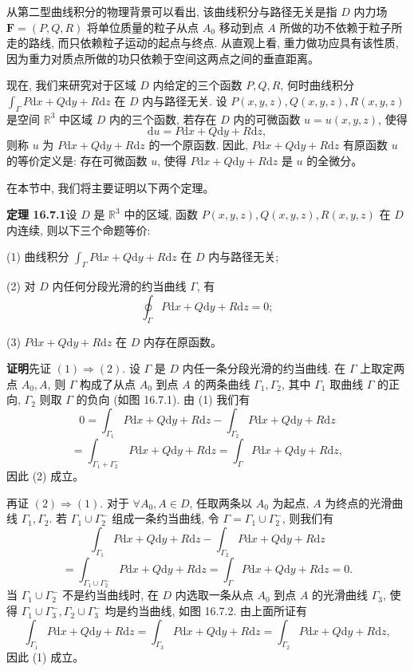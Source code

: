 \documentclass[UTF8,12pt,a4paper,fontset=fandol]{ctexart}
\begin{document}
从第二型曲线积分的物理背景可以看出, 该曲线积分与路径无关是指 $D$ 内力场 $\boldsymbol F=(P,Q,R)$ 将单位质量的粒子从点 $A_0$ 移动到点 $A$ 所做的功不依赖于粒子所走的路线, 而只依赖粒子运动的起点与终点. 从直观上看, 重力做功应具有该性质, 因为重力对质点所做的功只依赖于空间这两点之间的垂直距离。

现在, 我们来研究对于区域 $D$ 内给定的三个函数 $P,Q,R$, 何时曲线积分 $\int_\Gamma P\mathrm dx+Q\mathrm dy+R\mathrm dz$ 在 $D$ 内与路径无关. 设 $P(x,y,z),Q(x,y,z),R(x,y,z)$ 是空间 $\mathbb R^3$ 中区域 $D$ 内的三个函数, 若存在 $D$ 内的可微函数 $u=u(x,y,z)$, 使得
\[
  \mathrm du=P\mathrm dx+Q\mathrm dy+R\mathrm dz,
\]
则称 $u$ 为 $P\mathrm dx+Q\mathrm dy+R\mathrm dz$ 的一个原函数. 因此, $P\mathrm dx+Q\mathrm dy+R\mathrm dz$ 有原函数 $u$ 的等价定义是: 存在可微函数 $u$, 使得 $P\mathrm dx+Q\mathrm dy+R\mathrm dz$ 是 $u$ 的全微分。

在本节中, 我们将主要证明以下两个定理。

\noindent\textbf{定理 16.7.1}\quad 设 $D$ 是 $\mathbb R^3$ 中的区域, 函数 $P(x,y,z),Q(x,y,z),R(x,y,z)$ 在 $D$ 内连续, 则以下三个命题等价:

(1) 曲线积分 $\int_\Gamma P\mathrm dx+Q\mathrm dy+R\mathrm dz$ 在 $D$ 内与路径无关;

(2) 对 $D$ 内任何分段光滑的约当曲线 $\Gamma$, 有
\[
  \oint_\Gamma P\mathrm dx+Q\mathrm dy+R\mathrm dz=0;
\]

(3) $P\mathrm dx+Q\mathrm dy+R\mathrm dz$ 在 $D$ 内存在原函数。

\noindent\textbf{证明}\quad 先证 $(1)\Rightarrow(2)$. 设 $\Gamma$ 是 $D$ 内任一条分段光滑的约当曲线. 在 $\Gamma$ 上取定两点 $A_0,A$, 则 $\Gamma$ 构成了从点 $A_0$ 到点 $A$ 的两条曲线 $\Gamma_1,\Gamma_2$, 其中 $\Gamma_1$ 取曲线 $\Gamma$ 的正向, $\Gamma_2$ 则取 $\Gamma$ 的负向 (如图 16.7.1). 由 (1) 我们有
\[
  0=\int_{\Gamma_1}P\mathrm dx+Q\mathrm dy+R\mathrm dz
  -\int_{\Gamma_2}P\mathrm dx+Q\mathrm dy+R\mathrm dz
\]
\[
  =\int_{\Gamma_1+\Gamma_2^-}P\mathrm dx+Q\mathrm dy+R\mathrm dz
  =\int_\Gamma P\mathrm dx+Q\mathrm dy+R\mathrm dz,
\]
因此 (2) 成立。

再证 $(2)\Rightarrow(1)$. 对于 $\forall A_0,A\in D$, 任取两条以 $A_0$ 为起点, $A$ 为终点的光滑曲线 $\Gamma_1,\Gamma_2$. 若 $\Gamma_1\cup\Gamma_2^-$ 组成一条约当曲线, 令 $\Gamma=\Gamma_1\cup\Gamma_2^-$, 则我们有
\[
  \int_{\Gamma_1}P\mathrm dx+Q\mathrm dy+R\mathrm dz
  -\int_{\Gamma_2}P\mathrm dx+Q\mathrm dy+R\mathrm dz
\]
\[
  =\int_{\Gamma_1\cup\Gamma_2^-}P\mathrm dx+Q\mathrm dy+R\mathrm dz
  =\int_\Gamma P\mathrm dx+Q\mathrm dy+R\mathrm dz=0.
\]
当 $\Gamma_1\cup\Gamma_2^-$ 不是约当曲线时, 在 $D$ 内选取一条从点 $A_0$ 到点 $A$ 的光滑曲线 $\Gamma_3$, 使得 $\Gamma_1\cup\Gamma_3^-,\Gamma_2\cup\Gamma_3^-$ 均是约当曲线, 如图 16.7.2. 由上面所证有
\[
  \int_{\Gamma_1}P\mathrm dx+Q\mathrm dy+R\mathrm dz
  =\int_{\Gamma_3}P\mathrm dx+Q\mathrm dy+R\mathrm dz
  =\int_{\Gamma_2}P\mathrm dx+Q\mathrm dy+R\mathrm dz,
\]
因此 (1) 成立。
\end{document}

